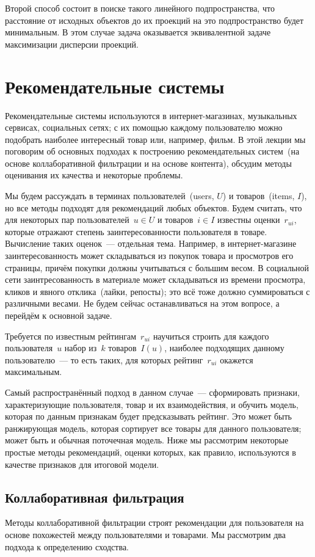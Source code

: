 \documentclass[12pt,fleqn]{article}
\begin{document}
Второй способ состоит в поиске такого линейного подпространства,
что расстояние от исходных объектов до их проекций на это подпространство
будет минимальным.
В этом случае задача оказывается эквивалентной задаче максимизации дисперсии проекций.

\section{Рекомендательные системы}
Рекомендательные системы используются в интернет-магазинах, музыкальных сервисах,
социальных сетях; с их помощью каждому пользователю можно подобрать наиболее интересный
товар или, например, фильм.
В этой лекции мы поговорим об основных подходах к построению рекомендательных систем~(на основе
коллаборативной фильтрации и на основе контента), обсудим методы оценивания их качества
и некоторые проблемы.

Мы будем рассуждать в терминах пользователей~(users, $U$) и товаров~(items, $I$),
но все методы подходят для рекомендаций любых объектов.
Будем считать, что для некоторых пар пользователей~$u \in U$ и товаров~$i \in I$ известны
оценки~$r_{ui}$, которые отражают степень заинтересованности пользователя в товаре.
Вычисление таких оценок~--- отдельная тема.
Например, в интернет-магазине заинтересованность может складываться из покупок товара
и просмотров его страницы, причём покупки должны учитываться с большим весом.
В социальной сети заинтресованность в материале может складываться из времени просмотра,
кликов и явного отклика~(лайки, репосты); это всё тоже должно суммироваться с различными весами.
Не будем сейчас останавливаться на этом вопросе, а перейдём к основной задаче.

Требуется по известным рейтингам~$r_{ui}$ научиться строить для каждого пользователя~$u$
набор из~$k$ товаров~$I(u)$, наиболее подходящих данному пользователю~--- то есть таких,
для которых рейтинг~$r_{ui}$ окажется максимальным.

Самый распространённый подход в данном случае~--- сформировать признаки, характеризующие пользователя, товар и их взаимодействия,
и обучить модель, которая по данным признакам будет предсказывать рейтинг.
Это может быть ранжирующая модель, которая сортирует все товары для данного пользователя; может быть и обычная поточечная модель.
Ниже мы рассмотрим некоторые простые методы рекомендаций, оценки которых, как правило, используются в качестве
признаков для итоговой модели.

\subsection{Коллаборативная фильтрация}
Методы коллаборативной фильтрации строят рекомендации для пользователя на основе
похожестей между пользователями и товарами.
Мы рассмотрим два подхода к определению сходства.
\end{document}
